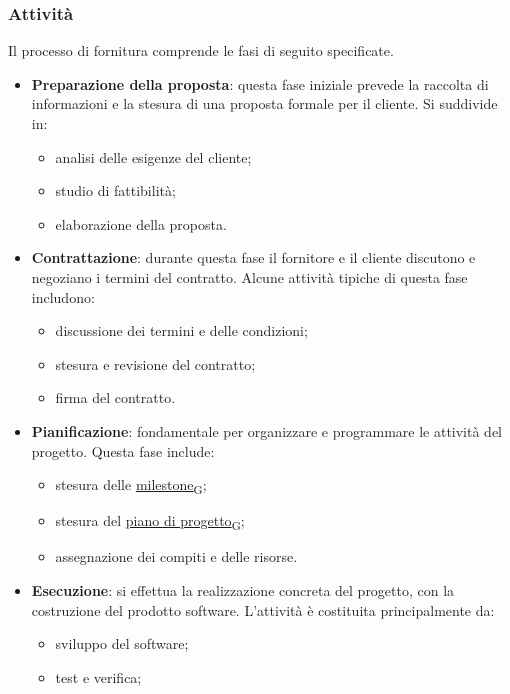 \subsubsection{Attività}
Il processo di fornitura comprende le fasi di seguito specificate.
\begin{itemize}
	\item \textbf{Preparazione della proposta}: questa fase iniziale prevede la raccolta di informazioni e la stesura di una proposta formale per il cliente. Si suddivide in:
	      \begin{itemize}
		      \item analisi delle esigenze del cliente;
		      \item studio di fattibilità;
		      \item elaborazione della proposta.
	      \end{itemize}
	\item \textbf{Contrattazione}: durante questa fase il fornitore e il cliente discutono e negoziano i termini del contratto. Alcune attività tipiche di questa fase includono:
	      \begin{itemize}
		      \item discussione dei termini e delle condizioni;
		      \item stesura e revisione del contratto;
		      \item firma del contratto.
	      \end{itemize}
	\item \textbf{Pianificazione}: fondamentale per organizzare e programmare le attività del progetto. Questa fase include:
	      \begin{itemize}
		      \item stesura delle \href{https://7last.github.io/docs/rtb/documentazione-interna/glossario\#milestone}{milestone\textsubscript{G}};
		      \item stesura del \href{https://7last.github.io/docs/rtb/documentazione-interna/glossario\#piano-di-progetto}{piano di progetto\textsubscript{G}};
		      \item assegnazione dei compiti e delle risorse.
	      \end{itemize}
	\item \textbf{Esecuzione}: si effettua la realizzazione concreta del progetto, con la costruzione del prodotto software. L'attività è costituita principalmente da:
	      \begin{itemize}
		      \item sviluppo del software;
		      \item test e verifica;

\end{itemize}
\end{itemize}
